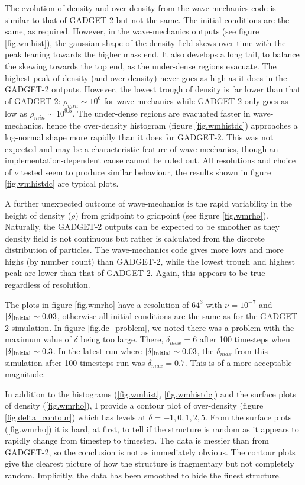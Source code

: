 The evolution of density and over-density from the wave-mechanics code is similar to that of GADGET-2 but not the same. The initial conditions are the same, as required. However, in the wave-mechanics outputs (see figure \ref{fig.wmhist}), the gaussian shape of the density field skews over time with the peak leaning towards the higher mass end. It also develops a long tail, to balance the skewing towards the top end, as the under-dense regions evacuate. The highest peak of density (and over-density) never goes as high as it does in the GADGET-2 outputs. However, the lowest trough of density is far lower than that of GADGET-2: $\rho_{min} \sim 10^6$ for wave-mechanics while GADGET-2 only goes as low as $\rho_{min} \sim 10^{9.5}$. The under-dense regions are evacuated faster in wave-mechanics, hence the over-density histogram (figure \ref{fig.wmhistdc}) approaches a log-normal shape more rapidly than it does for GADGET-2. This was not expected and may be a characteristic feature of wave-mechanics, though an implementation-dependent cause cannot be ruled out. All resolutions and choice of $\nu$ tested seem to produce similar behaviour, the results shown in figure \ref{fig.wmhistdc} are typical plots.

A further unexpected outcome of wave-mechanics is the rapid variability in the height of density ($\rho$) from gridpoint to gridpoint (see figure \ref{fig.wmrho}). Naturally, the GADGET-2 outputs can be expected to be smoother as they density field is not continuous but rather is calculated from the discrete distribution of particles. The wave-mechanics code gives more lows and more highs (by number count) than GADGET-2, while the lowest trough and highest peak are lower than that of GADGET-2. Again, this appears to be true regardless of resolution.

The plots in figure \ref{fig.wmrho} have a resolution of $64^3$ with $\nu = 10^{-7}$ and $|\delta|_{\rm initial} \sim 0.03$, otherwise all initial conditions are the same as for the GADGET-2 simulation. In figure \ref{fig.dc_problem}, we noted there was a problem with the maximum value of $\delta$ being too large. There, $\delta_{max} = 6$ after 100 timesteps when $|\delta|_{\rm initial} \sim 0.3$. In the latest run where $|\delta|_{\rm initial} \sim 0.03$, the $\delta_{max}$ from this simulation after 100 timesteps run was $\delta_{max} = 0.7$. This is of a more acceptable magnitude.

In addition to the histograms (\ref{fig.wmhist}, \ref{fig.wmhistdc}) and the surface plots of density (\ref{fig.wmrho}), I provide a contour plot of over-density (figure \ref{fig.delta_contour}) which has levels at $\delta =  -1, 0, 1, 2, 5$. From the surface plots (\ref{fig.wmrho}) it is hard, at first, to tell if the structure is random as it appears to rapidly change from timestep to timestep. The data is messier than from GADGET-2, so the conclusion is not as immediately obvious. The contour plots give the clearest picture of how the structure is fragmentary but not completely random. Implicitly, the data has been smoothed to hide the finest structure.

